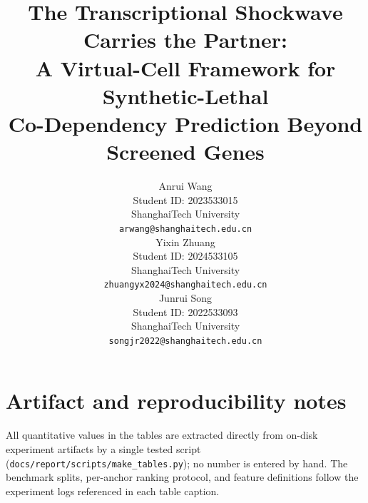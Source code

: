 \documentclass{article}
\title{The Transcriptional Shockwave Carries the Partner:\\
A Virtual-Cell Framework for Synthetic-Lethal\\
Co-Dependency Prediction Beyond Screened Genes}
\author{%
  Anrui Wang\\
  Student ID: 2023533015\\
  ShanghaiTech University\\
  \texttt{arwang@shanghaitech.edu.cn}\\
  \And
  Yixin Zhuang\\
  Student ID: 2024533105\\
  ShanghaiTech University\\
  \texttt{zhuangyx2024@shanghaitech.edu.cn}\\
  \And
  Junrui Song\\
  Student ID: 2022533093\\
  ShanghaiTech University\\
  \texttt{songjr2022@shanghaitech.edu.cn}\\
}
\begin{document}
\maketitle











\clearpage





\clearpage
\appendix

\section{Artifact and reproducibility notes}
All quantitative values in the tables are extracted directly from on-disk
experiment artifacts by a single tested script
(\texttt{docs/report/scripts/make\_tables.py}); no number is entered by hand.
The benchmark splits, per-anchor ranking protocol, and feature definitions
follow the experiment logs referenced in each table caption.

\end{document}
